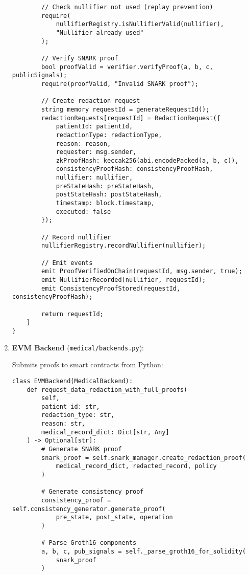 \begin{enumerate}
\begin{verbatim}
        // Check nullifier not used (replay prevention)
        require(
            nullifierRegistry.isNullifierValid(nullifier),
            "Nullifier already used"
        );
        
        // Verify SNARK proof
        bool proofValid = verifier.verifyProof(a, b, c, publicSignals);
        require(proofValid, "Invalid SNARK proof");
        
        // Create redaction request
        string memory requestId = generateRequestId();
        redactionRequests[requestId] = RedactionRequest({
            patientId: patientId,
            redactionType: redactionType,
            reason: reason,
            requester: msg.sender,
            zkProofHash: keccak256(abi.encodePacked(a, b, c)),
            consistencyProofHash: consistencyProofHash,
            nullifier: nullifier,
            preStateHash: preStateHash,
            postStateHash: postStateHash,
            timestamp: block.timestamp,
            executed: false
        });
        
        // Record nullifier
        nullifierRegistry.recordNullifier(nullifier);
        
        // Emit events
        emit ProofVerifiedOnChain(requestId, msg.sender, true);
        emit NullifierRecorded(nullifier, requestId);
        emit ConsistencyProofStored(requestId, consistencyProofHash);
        
        return requestId;
    }
}
\end{verbatim}
    
    \item \textbf{EVM Backend} (\texttt{medical/backends.py}):
    
    Submits proofs to smart contracts from Python:
    
    \begin{verbatim}
class EVMBackend(MedicalBackend):
    def request_data_redaction_with_full_proofs(
        self,
        patient_id: str,
        redaction_type: str,
        reason: str,
        medical_record_dict: Dict[str, Any]
    ) -> Optional[str]:
        # Generate SNARK proof
        snark_proof = self.snark_manager.create_redaction_proof(
            medical_record_dict, redacted_record, policy
        )
        
        # Generate consistency proof
        consistency_proof = self.consistency_generator.generate_proof(
            pre_state, post_state, operation
        )
        
        # Parse Groth16 components
        a, b, c, pub_signals = self._parse_groth16_for_solidity(
            snark_proof
        )
        

\end{verbatim}
\end{enumerate}
